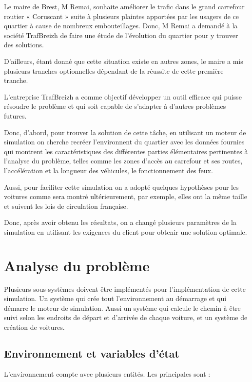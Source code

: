 \documentclass[12pt]{article} %
\begin{document}
Le maire de Brest, M Remai, souhaite améliorer le trafic dans le grand carrefour routier « Coruscant » suite à plusieurs plaintes apportées par les usagers de ce quartier à cause de nombreux embouteillages. Donc, M Remai a demandé à la société TrafBreizh de faire une étude de l'évolution du quartier pour y trouver des solutions.

D’ailleurs, étant donné que cette situation existe en autres zones, le maire a mis plusieurs tranches optionnelles dépendant de la réussite de cette première tranche.

L'entreprise TrafBreizh a comme objectif développer un outil efficace qui puisse résoudre le problème et qui soit capable de s'adapter à d'autres problèmes futures.

Donc, d'abord, pour trouver la solution de cette tâche, en utilisant un moteur de simulation on cherche recréer l'environnent du quartier avec les données fournies qui montrent les caractéristiques des différentes parties élémentaires pertinentes à l'analyse du problème, telles comme les zones d'accès au carrefour et ses routes, l'accélération et la longueur des véhicules, le fonctionnement des feux.

Aussi, pour faciliter cette simulation on a adopté quelques hypothèses pour les voitures comme sera montré ultérieurement, par exemple, elles ont la même taille et suivent les lois de circulation française.

Donc, après avoir obtenu les résultats, on a changé plusieurs paramètres de la simulation en utilisant les exigences du client pour obtenir une solution optimale.
\newpage
\section{Analyse du problème}\label{sec:2}
Plusieurs sous-systèmes doivent être implémentés pour l’implémentation de cette simulation. Un système qui crée tout l’environnement au démarrage et qui démarre le moteur de simulation. Aussi un système qui calcule le chemin à être suivi selon les endroits de départ et d’arrivée de chaque voiture, et un système de création de voitures. 

\subsection{Environnement et variables d'état}
L’environnement compte avec plusieurs entités. Les principales sont : 
\end{document}
